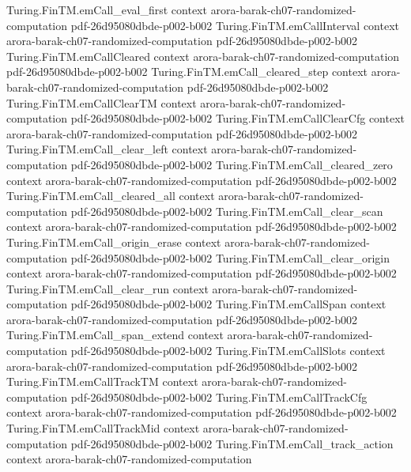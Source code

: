 \begin{theorem}
\proofstep
  {Turing.FinTM.emCall_eval_first}
  {context}
  {arora-barak-ch07-randomized-computation}
  {pdf-26d95080dbde-p002-b002}
\proofstep
  {Turing.FinTM.emCallInterval}
  {context}
  {arora-barak-ch07-randomized-computation}
  {pdf-26d95080dbde-p002-b002}
\proofstep
  {Turing.FinTM.emCallCleared}
  {context}
  {arora-barak-ch07-randomized-computation}
  {pdf-26d95080dbde-p002-b002}
\proofstep
  {Turing.FinTM.emCall_cleared_step}
  {context}
  {arora-barak-ch07-randomized-computation}
  {pdf-26d95080dbde-p002-b002}
\proofstep
  {Turing.FinTM.emCallClearTM}
  {context}
  {arora-barak-ch07-randomized-computation}
  {pdf-26d95080dbde-p002-b002}
\proofstep
  {Turing.FinTM.emCallClearCfg}
  {context}
  {arora-barak-ch07-randomized-computation}
  {pdf-26d95080dbde-p002-b002}
\proofstep
  {Turing.FinTM.emCall_clear_left}
  {context}
  {arora-barak-ch07-randomized-computation}
  {pdf-26d95080dbde-p002-b002}
\proofstep
  {Turing.FinTM.emCall_cleared_zero}
  {context}
  {arora-barak-ch07-randomized-computation}
  {pdf-26d95080dbde-p002-b002}
\proofstep
  {Turing.FinTM.emCall_cleared_all}
  {context}
  {arora-barak-ch07-randomized-computation}
  {pdf-26d95080dbde-p002-b002}
\proofstep
  {Turing.FinTM.emCall_clear_scan}
  {context}
  {arora-barak-ch07-randomized-computation}
  {pdf-26d95080dbde-p002-b002}
\proofstep
  {Turing.FinTM.emCall_origin_erase}
  {context}
  {arora-barak-ch07-randomized-computation}
  {pdf-26d95080dbde-p002-b002}
\proofstep
  {Turing.FinTM.emCall_clear_origin}
  {context}
  {arora-barak-ch07-randomized-computation}
  {pdf-26d95080dbde-p002-b002}
\proofstep
  {Turing.FinTM.emCall_clear_run}
  {context}
  {arora-barak-ch07-randomized-computation}
  {pdf-26d95080dbde-p002-b002}
\proofstep
  {Turing.FinTM.emCallSpan}
  {context}
  {arora-barak-ch07-randomized-computation}
  {pdf-26d95080dbde-p002-b002}
\proofstep
  {Turing.FinTM.emCall_span_extend}
  {context}
  {arora-barak-ch07-randomized-computation}
  {pdf-26d95080dbde-p002-b002}
\proofstep
  {Turing.FinTM.emCallSlots}
  {context}
  {arora-barak-ch07-randomized-computation}
  {pdf-26d95080dbde-p002-b002}
\proofstep
  {Turing.FinTM.emCallTrackTM}
  {context}
  {arora-barak-ch07-randomized-computation}
  {pdf-26d95080dbde-p002-b002}
\proofstep
  {Turing.FinTM.emCallTrackCfg}
  {context}
  {arora-barak-ch07-randomized-computation}
  {pdf-26d95080dbde-p002-b002}
\proofstep
  {Turing.FinTM.emCallTrackMid}
  {context}
  {arora-barak-ch07-randomized-computation}
  {pdf-26d95080dbde-p002-b002}
\proofstep
  {Turing.FinTM.emCall_track_action}
  {context}
  {arora-barak-ch07-randomized-computation}

\end{theorem}

